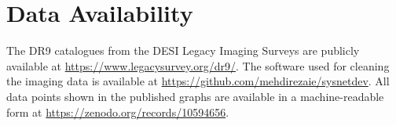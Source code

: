 \section*{Data Availability}
\label{sec:dataavail}
The DR9 catalogues from the DESI Legacy Imaging Surveys are publicly available at \href{https://www.legacysurvey.org/dr9/}{https://www.legacysurvey.org/dr9/}. The software used for cleaning the imaging data is available at \href{https://github.com/mehdirezaie/sysnetdev}{https://github.com/mehdirezaie/sysnetdev}. All data points shown in the published graphs are available in a machine-readable form at \href{https://zenodo.org/records/10594656}{https://zenodo.org/records/10594656}.